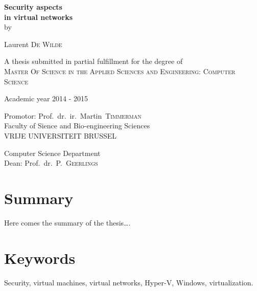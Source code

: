 
\newpage
{}
{
\setlength{\baselineskip}{12pt}
\setlength{\parindent}{0pt}
\setlength{\parskip}{6pt}

\begin{center}

\renewcommand{\baselinestretch}{1.1}
\noindent \huge \textbf{
Security aspects \\
in virtual networks
} \\
\renewcommand{\baselinestretch}{1.3}
\normalsize
\vspace{3mm}
by 

Laurent \textsc{De Wilde}

A thesis submitted in partial fulfillment for the degree  of\\
\textsc{Master Of Science in the Applied Sciences and Engineering: Computer Science}

Academic year 2014 - 2015

Promotor: Prof.~dr.~ir.~Martin~\textsc{Timmerman}\\

Faculty of Sience and Bio-engineering Sciences\\
VRIJE UNIVERSITEIT BRUSSEL

Computer Science Department\\
Dean: Prof.~dr.~P.~\textsc{Geerlings}

\end{center}

\section*{Summary}
Here comes the summary of the thesis\ldots .

\section*{Keywords}
Security, virtual machines, virtual networks, Hyper-V, Windows, virtualization.
}

\newpage %
